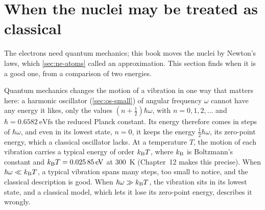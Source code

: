 \section{When the nuclei may be treated as classical}
\label{sec:pe-classical}

The electrons need quantum mechanics; this book moves the nuclei by
Newton's laws, which \cref{sec:ne-atoms} called an approximation. This
section finds when it is a good one, from a comparison of two energies.

Quantum mechanics changes the motion of a vibration in one way that
matters here: a harmonic oscillator (\cref{sec:os-small}) of angular frequency $\omega$
cannot have any energy it likes, only the values $(n + \frac12)\hbar\omega$, with $n = 0,
1, 2, \dots$ and $\hbar = \SI{0.6582}{\electronvolt\femto\second}$ the
reduced Planck constant\cite{Tuckerman2023}. Its energy therefore comes
in steps of $\hbar\omega$, and even in its lowest state, $n = 0$, it keeps the energy
$\frac12\hbar\omega$, its zero-point energy, which a classical oscillator
lacks. At a temperature $T$, the motion of each vibration carries a
typical energy of order $k_{\mathrm{B}} T$, where $k_{\mathrm{B}}$ is Boltzmann's constant and
$k_{\mathrm{B}} T = \SI{0.02585}{\electronvolt}$ at \SI{300}{\kelvin}
(Chapter~12 makes this precise). When $\hbar\omega \ll k_{\mathrm{B}} T$, a typical
vibration spans many steps, too small to notice, and the classical
description is good. When $\hbar\omega \gg k_{\mathrm{B}} T$, the vibration
sits in its lowest state, and a classical model, which lets it lose its
zero-point energy, describes it wrongly.

